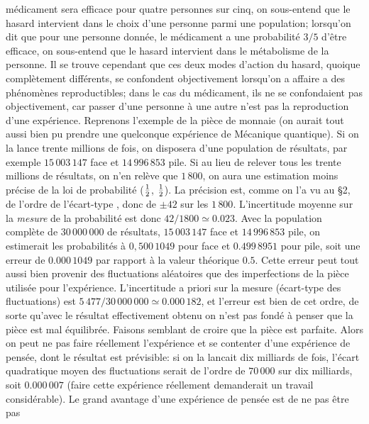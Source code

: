 m\'edicament sera efficace pour quatre personnes sur cinq, on 
sous-entend que le hasard intervient dans le choix d'une personne
parmi une population; lorsqu'on dit que pour une personne donn\'ee, le 
m\'edicament a une probabilit\'e $3/5$ d'\^etre efficace, on
sous-entend que le hasard intervient dans le m\'etabolisme de la 
personne. 
\medskip 
Il se trouve cependant que ces deux modes d'action du hasard, quoique 
compl\`etement diff\'erents,  se confondent objectivement lorsqu'on
a affaire a des ph\'enom\`enes reproductibles;  dans le cas du
m\'edicament,  ils ne se confondaient pas objectivement,  car passer 
d'une personne \`a une autre n'est pas la reproduction d'une exp\'erience. 
\medskip 
Reprenons l'exemple de la pi\`ece de monnaie (on aurait tout aussi bien
pu prendre une quelconque exp\'erience de M\'ecanique quantique).  Si on
la lance trente millions de fois,  on disposera d'une population de 
r\'esultats,  par exemple $15\, 003\, 147$ face et $14\, 996\, 853$
pile.  Si au lieu de relever tous les trente millions de r\'esultats,  on n'en 
rel\`eve que $1\, 800$,  on aura une estimation moins pr\'ecise de la loi
de probabilit\'e (${1 \over 2}$, ${1 \over 2}$).  La pr\'ecision est,  comme 
on  l'a vu au \S 2, de l'ordre de l'\'ecart-type \sqnab , donc 
de $\pm 42$ sur les $1\, 800$. L'incertitude moyenne sur la {\it mesure} 
de la probabilit\'e est donc $42 / 1800 \simeq  0.023$.  Avec la 
population compl\`ete de $30\, 000\, 000$ de r\'esultats, $15\, 003\, 
147$ face et $14\, 996\, 853$ pile,  on estimerait les probabilit\'es \`a 
$0,500\, 1049$ pour face et $0.499\, 8951$ pour pile, soit une erreur de 
$0.000\, 1049$ par rapport \`a la valeur th\'eorique $0.5$.  Cette erreur 
peut tout aussi bien provenir des fluctuations al\'eatoires que des 
imperfections de la pi\`ece utilis\'ee pour l'exp\'erience. 
L'incertitude a priori sur la mesure (\'ecart-type des fluctuations) est 
$5\, 477 / 30\, 000\, 000 \simeq 0.000\, 182$, et l'erreur est bien de 
cet ordre, de sorte qu'avec le r\'esultat effectivement obtenu on n'est 
pas fond\'e \`a penser que la pi\`ece est mal \'equilibr\'ee. 
\medskip 
Faisons semblant de croire que la pi\`ece est parfaite. Alors on peut ne
pas faire r\'eellement l'exp\'erience et se contenter d'une exp\'erience
de pens\'ee,  dont le r\'esultat est pr\'evisible:  si on la lancait dix 
milliards de fois,  l'\'ecart quadratique moyen des fluctuations serait de 
l'ordre de $70\, 000$ sur dix milliards,  soit $0.000\, 007$ (faire cette 
exp\'erience r\'eellement demanderait un travail consid\'erable).  Le 
grand avantage d'une exp\'erience de pens\'ee est de ne pas \^etre pas 
